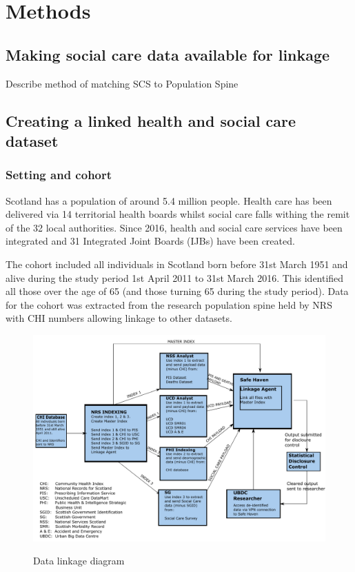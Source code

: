 \documentclass[]{article}
\title{}
\author{}
\date{}
\begin{document}
\chapter{Methods}\label{ch:methods}

\section{Making social care data available for linkage}\label{sec:linkage}

Describe method of matching SCS to Population Spine

\section{Creating a linked health and social care dataset}\label{sec:make-dataset}

\FloatBarrier

\subsection{Setting and cohort}\label{subsec:setting-cohort}

Scotland has a population of around 5.4 million people. Health care has
been delivered via 14 territorial health boards whilst social care falls
withing the remit of the 32 local authorities. Since 2016, health and
social care services have been integrated and 31 Integrated Joint Boards
(IJBs) have been created.

The cohort included all individuals in Scotland born before 31st March
1951 and alive during the study period 1st April 2011 to 31st March
2016. This identified all those over the age of 65 (and those turning 65
during the study period). Data for the cohort was extracted from the
research population spine held by NRS with CHI numbers allowing linkage
to other datasets.

\begin{landscape}
\begin{figure}
  \centering
    \caption{Data linkage diagram}
    \includegraphics{data/produced_data/linkage-diagram/linkage-diagram.pdf}
    \label{fig:methods-linkage}
\end{figure}
\end{landscape}
\end{document}
